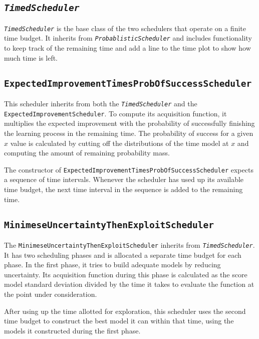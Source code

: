 \documentclass[a4paper,12pt,twoside,openright]{report}
\begin{document}
\subsection{\texttt{\textit{TimedScheduler}}}
\texttt{\textit{TimedScheduler}} is the base class of the two schedulers that operate on a finite time budget. It inherits from \texttt{\textit{ProbablisticScheduler}} and includes functionality to keep track of the remaining time and add a line to the time plot to show how much time is left.

\subsection{\texttt{ExpectedImprovementTimesProbOfSuccessScheduler}}
This scheduler inherits from both the \texttt{\textit{TimedScheduler}} and the \texttt{ExpectedImprovementScheduler}. To compute its acquisition function, it multiplies the expected improvement with the probability of successfully finishing the learning process in the remaining time. The probability of success for a given $x$ value is calculated by cutting off the distributions of the time model at $x$ and computing the amount of remaining probability mass.

The constructor of \texttt{ExpectedImprovementTimesProbOfSuccessScheduler} expects a sequence of time intervals. Whenever the scheduler has used up its available time budget, the next time interval in the sequence is added to the remaining time.

\subsection{\texttt{MinimeseUncertaintyThenExploitScheduler}}
The \texttt{MinimeseUncertaintyThenExploitScheduler} inherits from \texttt{\textit{TimedScheduler}}. It has two scheduling phases and is allocated a separate time budget for each phase. In the first phase, it tries to build adequate models by reducing uncertainty. Its acquisition function during this phase is calculated as the score model standard deviation divided by the time it takes to evaluate the function at the point under consideration.%

After using up the time allotted for exploration, this scheduler uses the second time budget to construct the best model it can within that time, using the models it constructed during the first phase.
\end{document}
